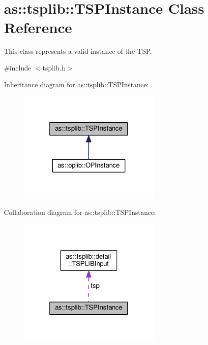 \hypertarget{classas_1_1tsplib_1_1TSPInstance}{}\section{as\+:\+:tsplib\+:\+:T\+S\+P\+Instance Class Reference}
\label{classas_1_1tsplib_1_1TSPInstance}


This class represents a valid instance of the T\+SP.  




{\ttfamily \#include $<$tsplib.\+h$>$}



Inheritance diagram for as\+:\+:tsplib\+:\+:T\+S\+P\+Instance\+:\nopagebreak
\begin{figure}[H]
\begin{center}
\leavevmode
\includegraphics[width=199pt]{classas_1_1tsplib_1_1TSPInstance__inherit__graph}
\end{center}
\end{figure}


Collaboration diagram for as\+:\+:tsplib\+:\+:T\+S\+P\+Instance\+:\nopagebreak
\begin{figure}[H]
\begin{center}
\leavevmode
\includegraphics[width=199pt]{classas_1_1tsplib_1_1TSPInstance__coll__graph}
\end{center}
\end{figure}
